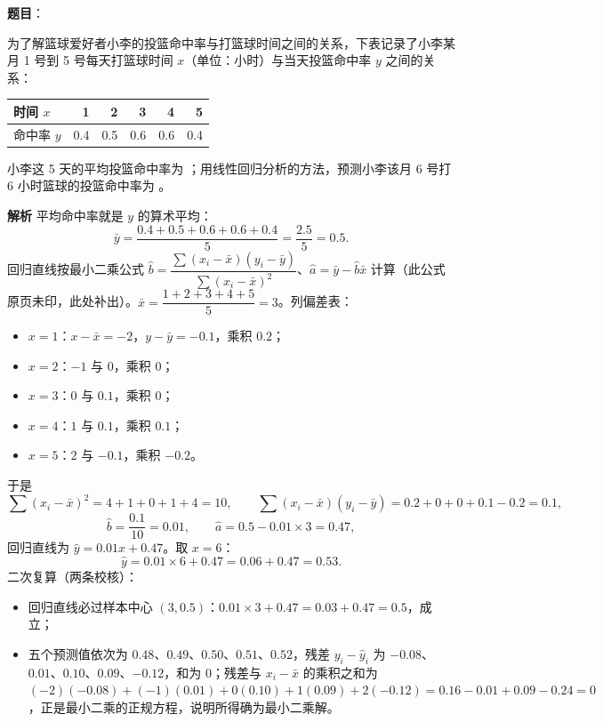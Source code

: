 \begin{answer}

\textbf{题目}：

为了解篮球爱好者小李的投篮命中率与打篮球时间之间的关系，下表记录了小李某月 1 号到 5 号每天打篮球时间 $x$（单位：小时）与当天投篮命中率 $y$ 之间的关系：

\begin{center}
\begin{tabular}{lrrrrr}
\toprule
时间 $x$ & 1 & 2 & 3 & 4 & 5 \\
\midrule
命中率 $y$ & 0.4 & 0.5 & 0.6 & 0.6 & 0.4 \\
\bottomrule
\end{tabular}
\end{center}

小李这 5 天的平均投篮命中率为 \gkblank{}；用线性回归分析的方法，预测小李该月 6 号打 6 小时篮球的投篮命中率为 \gkblank{}。

\textbf{解析}
平均命中率就是 $y$ 的算术平均：
\nopagebreak[4]
\[
\bar y=\frac{0.4+0.5+0.6+0.6+0.4}{5}=\frac{2.5}{5}=0.5.
\]
回归直线按最小二乘公式 $\hat b=\dfrac{\sum(x_i-\bar x)(y_i-\bar y)}{\sum(x_i-\bar x)^2}$、$\hat a=\bar y-\hat b\bar x$ 计算（此公式原页未印，此处补出）。$\bar x=\dfrac{1+2+3+4+5}{5}=3$。列偏差表：
\begin{itemize}
\item $x=1$：$x-\bar x=-2$，$y-\bar y=-0.1$，乘积 $0.2$；
\item $x=2$：$-1$ 与 $0$，乘积 $0$；
\item $x=3$：$0$ 与 $0.1$，乘积 $0$；
\item $x=4$：$1$ 与 $0.1$，乘积 $0.1$；
\item $x=5$：$2$ 与 $-0.1$，乘积 $-0.2$。
\end{itemize}

于是
\nopagebreak[4]
\[
\sum(x_i-\bar x)^2=4+1+0+1+4=10,\qquad
\sum(x_i-\bar x)(y_i-\bar y)=0.2+0+0+0.1-0.2=0.1,
\]
\nopagebreak[4]
\[
\hat b=\frac{0.1}{10}=0.01,\qquad \hat a=0.5-0.01\times3=0.47,
\]
回归直线为 $\hat y=0.01x+0.47$。取 $x=6$：
\nopagebreak[4]
\[
\hat y=0.01\times6+0.47=0.06+0.47=0.53.
\]
二次复算（两条校核）：
\begin{itemize}
\item 回归直线必过样本中心 $(3,0.5)$：$0.01\times3+0.47=0.03+0.47=0.5$，成立；
\item 五个预测值依次为 $0.48$、$0.49$、$0.50$、$0.51$、$0.52$，残差 $y_i-\hat y_i$ 为 $-0.08$、$0.01$、$0.10$、$0.09$、$-0.12$，和为 $0$；残差与 $x_i-\bar x$ 的乘积之和为 $(-2)(-0.08)+(-1)(0.01)+0(0.10)+1(0.09)+2(-0.12)=0.16-0.01+0.09-0.24=0$，正是最小二乘的正规方程，说明所得确为最小二乘解。
\end{itemize}


\end{answer}
